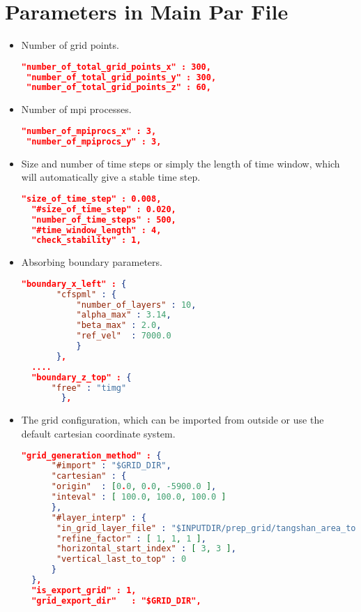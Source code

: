 \section{Parameters in Main Par File}
\begin{itemize} 
\item Number of grid points.
\begin{lstlisting}[language=json,
 frame=tb]
 "number_of_total_grid_points_x" : 300,
 "number_of_total_grid_points_y" : 300,
 "number_of_total_grid_points_z" : 60,                
\end{lstlisting}
\item Number of mpi processes.
\begin{lstlisting}[language=json,
 frame=tb]
 "number_of_mpiprocs_x" : 3,
 "number_of_mpiprocs_y" : 3,                
\end{lstlisting}
\item Size and number of time steps or simply the length of time window, which will automatically give a stable time step.
\begin{lstlisting}[language=json,
 frame=tb]
  "size_of_time_step" : 0.008,
  "#size_of_time_step" : 0.020,
  "number_of_time_steps" : 500,
  "#time_window_length" : 4,
  "check_stability" : 1,                
\end{lstlisting}
\item Absorbing boundary parameters.
\begin{lstlisting}[language=json,
 frame=tb]
 "boundary_x_left" : {
       "cfspml" : {
           "number_of_layers" : 10,
           "alpha_max" : 3.14,
           "beta_max" : 2.0,
           "ref_vel"  : 7000.0
           }
       },
  ....
  "boundary_z_top" : {
      "free" : "timg"
        },                
\end{lstlisting}
\item The grid configuration, which can be imported from outside or use the default cartesian coordinate system.
\begin{lstlisting}[language=json,
 frame=tb]    
"grid_generation_method" : {
      "#import" : "$GRID_DIR",
      "cartesian" : {
      "origin"  : [0.0, 0.0, -5900.0 ],
      "inteval" : [ 100.0, 100.0, 100.0 ]
      },
      "#layer_interp" : {
       "in_grid_layer_file" : "$INPUTDIR/prep_grid/tangshan_area_topo.gdlay",
       "refine_factor" : [ 1, 1, 1 ],
       "horizontal_start_index" : [ 3, 3 ],
       "vertical_last_to_top" : 0
      }
  },
  "is_export_grid" : 1,
  "grid_export_dir"   : "$GRID_DIR",
\end{lstlisting}

\end{itemize}
